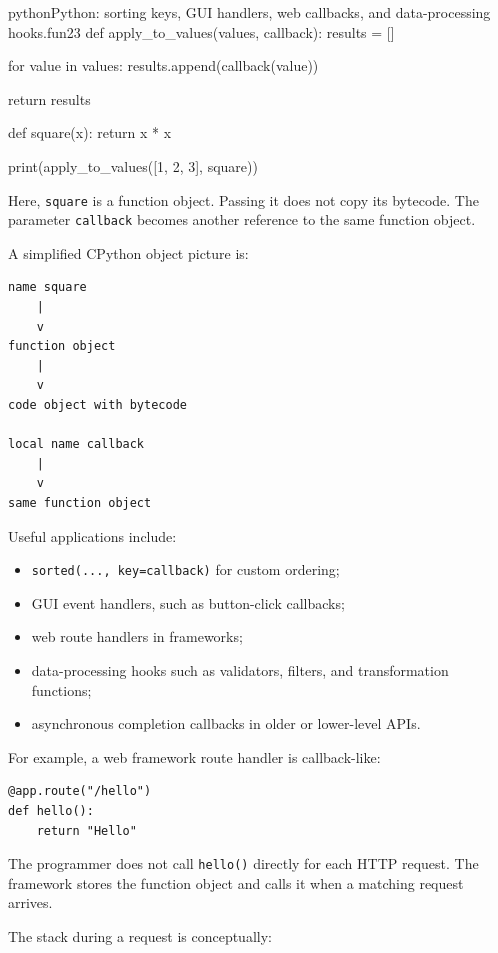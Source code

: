 \documentclass[a4paper,twoside]{report}
\begin{document}
\begin{codebox}[]{python}{Python: sorting keys, GUI handlers, web callbacks, and data-processing hooks.}{fun23}
def apply_to_values(values, callback):
    results = []

    for value in values:
        results.append(callback(value))

    return results


def square(x):
    return x * x


print(apply_to_values([1, 2, 3], square))
\end{codebox}


Here, \texttt{square} is a function object. Passing it does not copy its bytecode. The parameter \texttt{callback} becomes another reference to the same function object.

A simplified CPython object picture is:

\begin{verbatim}
name square
    |
    v
function object
    |
    v
code object with bytecode

local name callback
    |
    v
same function object
\end{verbatim}

Useful applications include:

\begin{itemize}
    \item \texttt{sorted(..., key=callback)} for custom ordering;
    \item GUI event handlers, such as button-click callbacks;
    \item web route handlers in frameworks;
    \item data-processing hooks such as validators, filters, and transformation functions;
    \item asynchronous completion callbacks in older or lower-level APIs.
\end{itemize}

For example, a web framework route handler is callback-like:

\begin{verbatim}
@app.route("/hello")
def hello():
    return "Hello"
\end{verbatim}

The programmer does not call \texttt{hello()} directly for each HTTP request. The framework stores the function object and calls it when a matching request arrives.

The stack during a request is conceptually:
\end{document}
